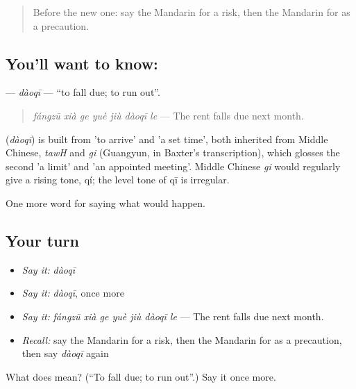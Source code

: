 \label{lesson:ZH-C389-daoqi}



\begin{quote}
Before the new one: say the Mandarin for a risk, then the Mandarin for as a precaution.
\end{quote}

\subsection*{You'll want to know: }
\textbf{} — \emph{dàoqī} — \textquotedblleft{}to fall due; to run out\textquotedblright{}.

\begin{quote}
\emph{fángzū xià ge yuè jiù dàoqī le} — The rent falls due next month.
\end{quote}

\begin{cousinweb}
\textbf{} (\emph{dàoqī}) is built from  'to arrive' and  'a set time', both inherited from Middle Chinese, \emph{tawH} and \emph{gi} (Guangyun, in Baxter's transcription), which glosses the second 'a limit' and 'an appointed meeting'. Middle Chinese \emph{gi} would regularly give a rising tone, qí; the level tone of qī is irregular.
\end{cousinweb}

\begin{grammarlens}[title={What you've built}]
One more word for saying what would happen.
\end{grammarlens}

\subsection*{Your turn}
\begin{itemize}
\raggedright
  \item \emph{Say it:} \emph{dàoqī}
  \item \emph{Say it:} \emph{dàoqī}, once more
  \item \emph{Say it:} \emph{fángzū xià ge yuè jiù dàoqī le} — The rent falls due next month.
  \item \emph{Recall:} say the Mandarin for a risk, then the Mandarin for as a precaution, then say \emph{dàoqī} again
\end{itemize}

\begin{tcolorbox}[breakable,colback=teal!4,colframe=teal!35!black,title={Before you move on}]
What does  mean? (\textquotedblleft{}To fall due; to run out\textquotedblright{}.) Say it once more.
\end{tcolorbox}
